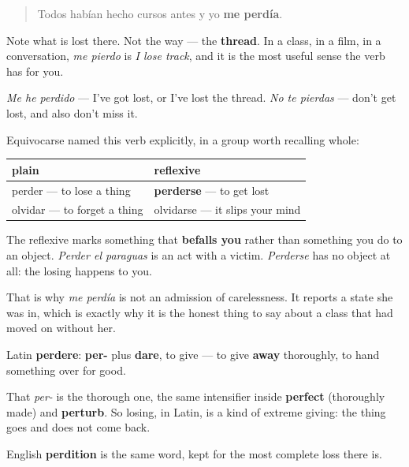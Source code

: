 \begin{quote}
Todos habían hecho cursos antes y yo \textbf{me perdía}.
\end{quote}

Note what is lost there. Not the way — the \textbf{thread}. In a class, in a film, in a conversation, \emph{me pierdo} is \emph{I lose track}, and it is the most useful sense the verb has for you.

\emph{Me he perdido} — I've got lost, or I've lost the thread. \emph{No te pierdas} — don't get lost, and also don't miss it.

\begin{grammarlens}[title={Grammar Lens: the family you were told to notice}]
Equivocarse named this verb explicitly, in a group worth recalling whole:

\noindent
\begin{tabularx}{\linewidth}{@{}>{\raggedright\arraybackslash}X>{\raggedright\arraybackslash}X@{}}
\toprule
\textbf{plain} & \textbf{reflexive} \\
\midrule
perder — to lose a thing & \textbf{perderse} — to get lost \\
olvidar — to forget a thing & olvidarse — it slips your mind \\
\bottomrule
\end{tabularx}

The reflexive marks something that \textbf{befalls you} rather than something you do to an object. \emph{Perder el paraguas} is an act with a victim. \emph{Perderse} has no object at all: the losing happens to you.

That is why \emph{me perdía} is not an admission of carelessness. It reports a state she was in, which is exactly why it is the honest thing to say about a class that had moved on without her.
\end{grammarlens}

\begin{cousinweb}
Latin \textbf{perdere}: \textbf{per-} plus \textbf{dare}, to give — to give \textbf{away} thoroughly, to hand something over for good.

That \emph{per-} is the thorough one, the same intensifier inside \textbf{perfect} (thoroughly made) and \textbf{perturb}. So losing, in Latin, is a kind of extreme giving: the thing goes and does not come back.

English \textbf{perdition} is the same word, kept for the most complete loss there is.
\end{cousinweb}

